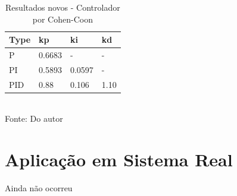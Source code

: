 \begin{table}[H]
    \caption{Resultados novos - Controlador por Cohen-Coon}
    \centering
    \begin{tabular}{|l|l|l|l|}
        \hline
        \textbf{Type} & \textbf{kp} & \textbf{ki} & \textbf{kd} \\
        \hline
        P             & 0.6683      & -           & -           \\
        \hline
        PI            & 0.5893      & 0.0597      & -           \\
        \hline
        PID           & 0.88        & 0.106       & 1.10        \\
        \hline
    \end{tabular}
    \label{tab:comp_nw_cc}
    \\
    \vspace{0cm}\hspace{0cm}\small{Fonte: Do autor}
\end{table}


\section{Aplicação em Sistema Real}

Ainda não ocorreu
